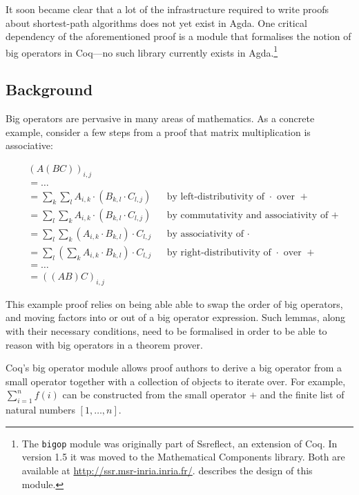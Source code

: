 \documentclass[a4paper]{scrartcl}
\begin{document}
It soon became clear that a lot of the infrastructure required to write proofs about shortest-path algorithms does not yet exist in Agda.
One critical dependency of the aforementioned proof is a module that formalises the notion of big operators in Coq---no such library currently exists in Agda.\footnote{The \texttt{bigop} module was originally part of Ssreflect, an extension of Coq. In version 1.5 it was moved to the Mathematical Components library. Both are available at \url{http://ssr.msr-inria.inria.fr/}. \autocite{bertot_canonical_2008} describes the design of this module.}

\subsection{Background}

Big operators are pervasive in many areas of mathematics. As a concrete example, consider a few steps from a proof that matrix multiplication is associative:

\begin{align*}
&\left(A \left(B C\right)\right)_{i,j} \\
&= \dots \\
&= \sum_k \sum_l  A_{i,k} \cdot \left( B_{k,l} \cdot C_{l,j} \right)
  && \text{by left-distributivity of \(\cdot\) over \(+\)} \\
&= \sum_l \sum_k  A_{i,k} \cdot \left( B_{k,l} \cdot C_{l,j} \right)
  && \text{by commutativity and associativity of \(+\)} \\
&= \sum_l \sum_k \left( A_{i,k} \cdot B_{k,l} \right) \cdot C_{l,j}
  && \text{by associativity of \(\cdot\)} \\
&= \sum_l \left( \sum_k A_{i,k} \cdot B_{k,l} \right) \cdot C_{l,j}
  && \text{by right-distributivity of \(\cdot\) over \(+\)} \\
&= \dots \\
&= \left( \left( A  B \right) C\right)_{i,j}
\end{align*}

This example proof relies on being able able to swap the order of big operators, and moving factors into or out of a big operator expression. Such lemmas, along with their necessary conditions, need to be formalised in order to be able to reason with big operators in a theorem prover.

Coq's big operator module allows proof authors to derive a big operator from a small operator together with a collection of objects to iterate over. For example, \(\sum_{i=1}^n f(i)\) can be constructed from the small operator \(+\) and the finite list of natural numbers \([1, \dots, n]\).
\end{document}
